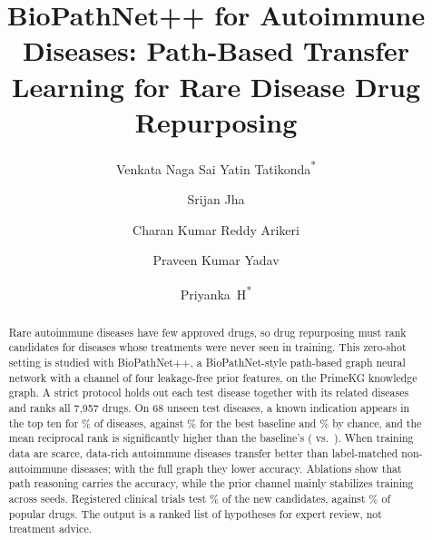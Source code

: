 \documentclass{svproc}
\newcommand{\sysname}{BioPathNet++\xspace}
\begin{document}
\mainmatter
\title{BioPathNet++ for Autoimmune Diseases: Path-Based Transfer Learning for Rare Disease Drug Repurposing}
\author{Venkata Naga Sai Yatin Tatikonda\textsuperscript{*} \and Srijan Jha \and Charan Kumar Reddy Arikeri \and Praveen Kumar Yadav \and Priyanka~H\textsuperscript{*}}
\maketitle

\begin{abstract}
Rare autoimmune diseases have few approved drugs, so drug repurposing must rank candidates for diseases whose treatments were never seen in training. This zero-shot setting is studied with \sysname, a BioPathNet-style path-based graph neural network with a channel of four leakage-free prior features, on the PrimeKG knowledge graph. A strict protocol holds out each test disease together with its related diseases and ranks all 7,957 drugs. On 68 unseen test diseases, a known indication appears in the top ten for \TabModelTestAnyTen\% of diseases, against \TabKnnTestAnyTen\% for the best baseline and \RandExpAnyTenTest\% by chance, and the mean reciprocal rank is significantly higher than the baseline's (\TestMrr{} vs.\ \KnnTestMrr). When training data are scarce, data-rich autoimmune diseases transfer better than label-matched non-autoimmune diseases; with the full graph they lower accuracy. Ablations show that path reasoning carries the accuracy, while the prior channel mainly stabilizes training across seeds. Registered clinical trials test \ValTrialTestedModel\% of the new candidates, against \ValTrialTestedPop\% of popular drugs. The output is a ranked list of hypotheses for expert review, not treatment advice.
\end{abstract}
\end{document}
